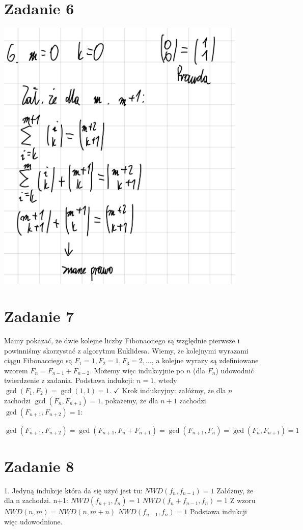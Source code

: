 \documentclass[12pt]{article}
\begin{document}
\section{Zadanie 6}
\includegraphics[width=120mm]{zad6}

\section{Zadanie 7}
Mamy pokazać, że dwie kolejne liczby Fibonacciego są względnie pierwsze i powinniśmy skorzystać z algorytmu Euklidesa. 
Wiemy, że kolejnymi wyrazami ciągu Fibonacciego są $F_1 = 1, F_2 = 1, F_3 = 2, \dots$, a kolejne wyrazy są zdefiniowane wzorem $F_{n} = F_{n-1} + F_{n-2}$. Możemy więc indukcyjnie po $n$ (dla $F_n$) udowodnić twierdzenie z zadania.
Podstawa indukcji: $n = 1$, wtedy $\gcd(F_1, F_2) = \gcd(1, 1) = 1$. $\checkmark$ 
Krok indukcyjny: załóżmy, że dla $n$ zachodzi $\gcd(F_n, F_{n+1}) = 1$, pokażemy, że dla $n+1$ zachodzi $\gcd(F_{n+1}, F_{n+2}) = 1$:

$\gcd(F_{n+1}, F_{n+2})	= \gcd(F_{n+1}, F_{n} + F_{n+1}) = \gcd(F_{n+1}, F_{n}) = \gcd(F_{n}, F_{n+1}) = 1$					

\section{Zadanie 8}
1. Jedyną indukcje która da się użyć jest tu:
$NWD(f_n, f_{n-1}) = 1$
Załóżmy, że dla n zachodzi. n+1:
$NWD(f_{n+1}, f_n) = 1$
$NWD(f_n + f_{n-1}, f_n) = 1$
Z wzoru $NWD(n,m)=NWD(n,m+n)$
$NWD(f_{n-1}, f_n) = 1$
Podstawa indukcji więc udowodnione.
\end{document}
